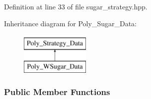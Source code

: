Definition at line 33 of file sugar\+\_\+strategy.\+hpp.

Inheritance diagram for Poly\+\_\+\+Sugar\+\_\+\+Data\+:\begin{figure}[H]
\begin{center}
\leavevmode
\includegraphics[height=2.000000cm]{group__strategygroup}
\end{center}
\end{figure}
\subsubsection*{Public Member Functions}
